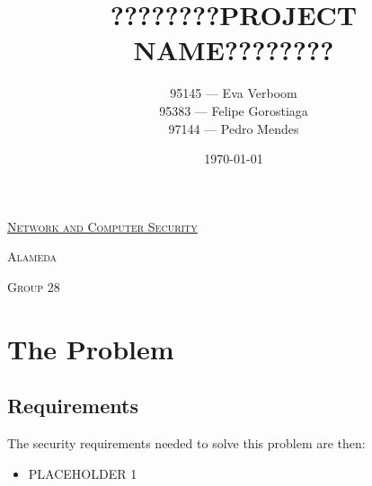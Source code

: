 \documentclass[a4paper]{article}
\begin{document}
\title{????????PROJECT NAME????????}
\author{%
    95145 --- Eva Verboom\\
    95383 --- Felipe Gorostiaga \\
    97144 --- Pedro Mendes \\
}
\date{\today}

\begin{titlepage}

    \begin{center}
        \begin{minipage}{0.75\linewidth}
            \centering
            \vspace{1.5cm}
            \href{https://fenix.tecnico.ulisboa.pt/disciplinas/SIRS7/2019-2020/1-semestre}
            {\scshape\LARGE Network and Computer Security} \par
            \vspace{1cm}
            {\scshape\Large Alameda} \par
            \vspace{1cm}
            {\scshape\Large Group 28} \par
            \vspace{1.5cm}

            \maketitle
        \end{minipage}
    \end{center}

\end{titlepage}

\tableofcontents

\pagebreak

\section{The Problem}

\subsection{Requirements}

The security requirements needed to solve this problem are then:
\begin{itemize}
    \item PLACEHOLDER 1
\end{itemize}
\end{document}
